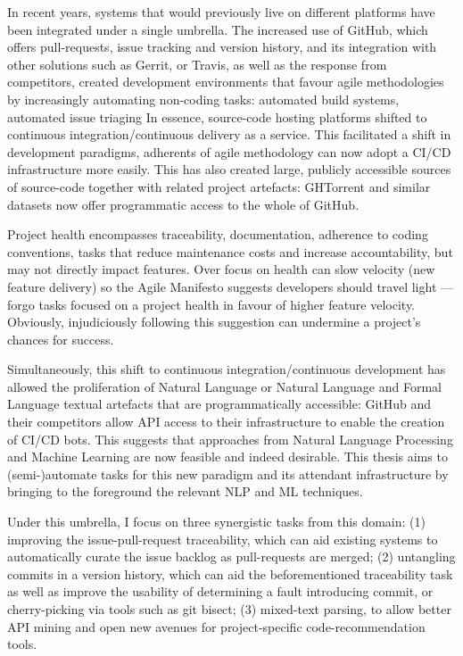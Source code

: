 In recent years, systems that would previously live on different platforms have
been integrated under a single umbrella. The increased use of GitHub, which
offers pull-requests, issue tracking and version history, and its integration
with other solutions such as Gerrit, or Travis, as well as the response from
competitors, created development environments that favour agile methodologies by
increasingly automating non-coding tasks: automated build systems, automated
issue triaging \etc In essence, source-code hosting platforms shifted to
continuous integration/continuous delivery as a service. This facilitated a
shift in development paradigms, adherents of agile methodology can now adopt a
CI/CD infrastructure more easily. This has also created large, publicly
accessible sources of source-code together with related project artefacts:
GHTorrent and similar datasets now offer programmatic access to the whole of
GitHub.

Project health encompasses traceability, documentation, adherence to coding
conventions, tasks that reduce maintenance costs and increase accountability,
but may not directly impact features.  Over focus on health can slow velocity
(new feature delivery) so the Agile Manifesto suggests developers should travel
light --- forgo tasks focused on a project health in favour of higher feature
velocity. Obviously, injudiciously following this suggestion can undermine a
project's chances for success.

Simultaneously, this shift to continuous integration/continuous development has
allowed the proliferation of Natural Language or Natural Language and Formal
Language textual artefacts that are programmatically accessible: GitHub and
their competitors allow API access to their infrastructure to enable the
creation of CI/CD bots. This suggests that approaches from Natural Language
Processing and Machine Learning are now feasible and indeed desirable. This
thesis aims to (semi-)automate tasks for this new paradigm and its attendant
infrastructure by bringing to the foreground the relevant NLP and ML techniques.

Under this umbrella, I focus on three synergistic tasks from this domain: (1)
improving the issue-pull-request traceability, which can aid existing systems to
automatically curate the issue backlog as pull-requests are merged; (2)
untangling commits in a version history, which can aid the beforementioned
traceability task as well as improve the usability of determining a fault
introducing commit, or cherry-picking via tools such as git bisect; (3)
mixed-text parsing, to allow better API mining and open new avenues for
project-specific code-recommendation tools.